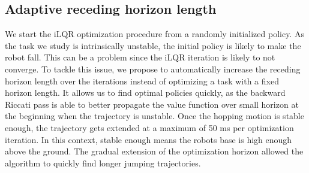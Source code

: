 %
\subsection{Adaptive receding horizon length}
%
%
We start the iLQR optimization procedure from a randomly initialized policy. As the task we study is intrinsically unstable, the initial policy is likely to make the robot fall. This can be a problem since the iLQR iteration is likely to not converge.
To tackle this issue, we propose to automatically increase the receding horizon length over the iterations instead of optimizing a task with a fixed horizon length.
It allows us to find optimal policies quickly, as the backward Riccati pass is able to better propagate the value function over
small horizon at the beginning when the trajectory is unstable.
Once the hopping motion is stable enough, the trajectory gets extended at a maximum of 50 ms per optimization iteration. In this context, stable enough means the robots base is high enough above the ground. The gradual extension of the optimization horizon allowed the algorithm to quickly find longer jumping trajectories.
%
